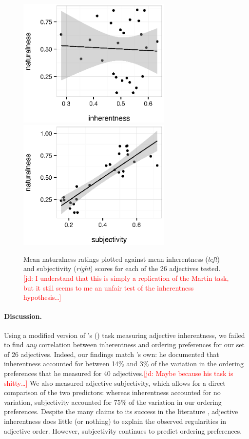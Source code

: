 \documentclass[12pt]{article}
\newcommand{\jd}[1]{\textcolor{red}{[jd: #1]}}
\begin{document}
\renewcommand\thefigure{S.\arabic{figure}}
\begin{figure}
	\centering\includegraphics[width=3in]{plots/expt1-inherentness-naturalness.eps}\includegraphics[width=3in]{plots/expt1-subjectivity2-naturalness.eps}
	\caption{Mean naturalness ratings plotted against mean inherentness (\emph{left}) and subjectivity (\emph{right}) scores for each of the 26 adjectives tested. \jd{I understand that this is simply a replication of the Martin task, but it still seems to me an unfair test of the inherentness hypothesis\dots}}\label{fig:inherentness}
\end{figure}

\paragraph{Discussion.} Using a modified version of \citeauthor{martin1969}'s (\citeyear{martin1969}) task measuring adjective inherentness, we failed to find \emph{any} correlation between inherentness and ordering preferences for our set of 26 adjectives. Indeed, our findings match \citeauthor{martin1969}'s own: he documented that inherentness accounted for between 14\% and 3\% of the variation in the ordering preferences that he measured for 40 adjectives.\jd{Maybe because his task is shitty\dots} We also measured adjective subjectivity, which allows for a direct comparison of the two predictors: whereas inherentness accounted for no variation, subjectivity accounted for 75\% of the variation in our ordering preferences. Despite the many claims to its success in the literature \citep[e.g.,][]{sweet1898,whorf1945,kemmerer2000}, adjective inherentness does little (or nothing) to explain the observed regularities in adjective order. However, subjectivity continues to predict ordering preferences.
\end{document}
